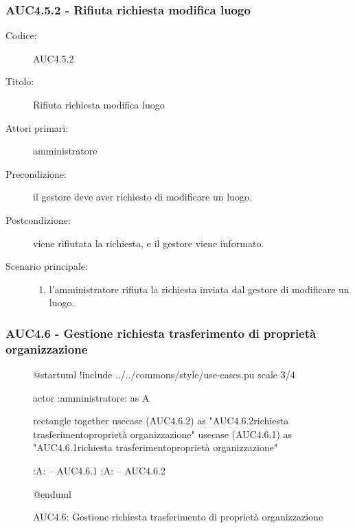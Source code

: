 \documentclass[casi-duso]{subfiles}
\begin{document}
\subsubsection{AUC4.5.2 - Rifiuta richiesta modifica luogo}%
\label{subsub:AUC4.5.2}
\begin{description}
  \item[Codice:] AUC4.5.2
  \item[Titolo:] Rifiuta richiesta modifica luogo
  \item[Attori primari:] amministratore
  \item[Precondizione:] il gestore deve aver richiesto di modificare un luogo.
  \item[Postcondizione:] viene rifiutata la richiesta, e il gestore viene informato.
  \item[Scenario principale:]
  \begin{enumerate}
    \item l'amministratore rifiuta la richiesta inviata dal gestore di modificare un luogo.
  \end{enumerate}
\end{description}

\subsubsection{AUC4.6 - Gestione richiesta trasferimento di proprietà organizzazione}%
\label{subsub:AUC4.6}

\begin{figure}[h!]
  \centering
  \begin{plantuml}
  @startuml
  !include ../../commons/style/use-cases.pu
  scale 3/4

  actor :amministratore: as A

  rectangle {
    together {
      usecase (AUC4.6.2) as "AUC4.6.2\nRifiuta richiesta trasferimento\ndi proprietà organizzazione"
      usecase (AUC4.6.1) as "AUC4.6.1\nAccetta richiesta trasferimento\ndi proprietà organizzazione"
    }
  }

  :A: -- AUC4.6.1
  :A: -- AUC4.6.2

  @enduml
  \end{plantuml}
  \caption{AUC4.6: Gestione richiesta trasferimento di proprietà organizzazione}
  \label{fig:auc4_6}
\end{figure}
\end{document}
